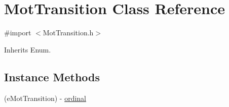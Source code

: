\hypertarget{interface_mot_transition}{}\section{Mot\+Transition Class Reference}
\label{interface_mot_transition}


{\ttfamily \#import $<$Mot\+Transition.\+h$>$}



Inherits Enum.

\subsection*{Instance Methods}
\begin{DoxyCompactItemize}
\item 
(e\+Mot\+Transition) -\/ \hyperlink{interface_mot_transition_a8684ad55f7c2e848a70787e6d0ed32a6}{ordinal}
\end{DoxyCompactItemize}
